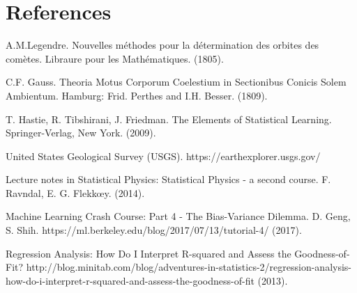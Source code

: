 \newpage
\section{References}

\begingroup
\renewcommand{\section}[2]{}
\begin{thebibliography}{}
	A.M.Legendre. 
	Nouvelles méthodes pour la détermination des orbites des comètes.
	Libraure pour les Mathématiques.
	(1805).
	
	C.F. Gauss. 
	Theoria Motus Corporum Coelestium in Sectionibus Conicis Solem Ambientum. 
	Hamburg: Frid. Perthes and I.H. Besser.
	(1809).
	
	T. Hastie, R. Tibshirani, J. Friedman.
	The Elements of Statistical Learning.
	Springer-Verlag, New York.
	(2009).
	
	United States Geological Survey (USGS).
	https://earthexplorer.usgs.gov/
	
	Lecture notes in Statistical Physics: Statistical Physics - a second course.
	F. Ravndal, E. G. Flekk\oe y.
	(2014).
	
	Machine Learning Crash Course: Part 4 - The Bias-Variance Dilemma.
	D. Geng, S. Shih.
	https://ml.berkeley.edu/blog/2017/07/13/tutorial-4/
	(2017).
	
	Regression Analysis: How Do I Interpret R-squared and Assess the Goodness-of-Fit?
	http://blog.minitab.com/blog/adventures-in-statistics-2/regression-analysis-how-do-i-interpret-r-squared-and-assess-the-goodness-of-fit
	(2013).
	
\end{thebibliography}
\endgroup